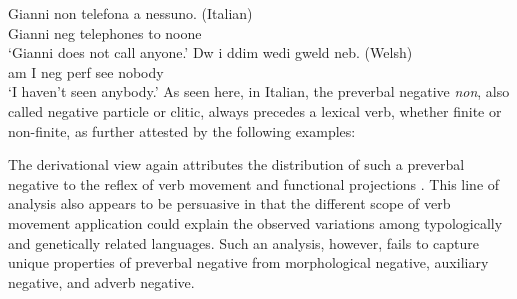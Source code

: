 \documentclass[output=paper
                ,modfonts
                		,nonflat
	        ,collection
	        ,collectionchapter
	        ,collectiontoclongg
 	        ,biblatex
                ,babelshorthands
                ,newtxmath
                ,draftmode
                ,colorlinks, citecolor=brown
]{./langsci/langscibook}
\begin{document}
{\eal
\ex \label{position-1a}
\gll Gianni non telefona a nessuno. \hfill (Italian) \\
     Gianni {\sc neg} telephones to noone\\
\glt`Gianni does not call anyone.'
\ex \label{position-1c}
\gll Dw i ddim wedi gweld neb. \hfill  (Welsh) \\
     am I {\sc neg} {\sc perf} see nobody\\
\glt `I haven't seen anybody.'
\zl
%
%
As seen here, in Italian,
the preverbal negative \textit{non}, also called negative particle or
clitic, always precedes a lexical  verb, whether finite or
non-finite, as further attested by the following
examples:

\eal
\zl

The derivational view again attributes the distribution of such
a preverbal negative to the reflex of verb movement and functional
projections \citep[see]{Belletti:90, Zanuttini:91}. This line of analysis also appears to be persuasive
in that the different scope of verb movement application could explain
the observed variations among typologically and genetically related
languages. Such an analysis, however,
  fails to capture unique properties of preverbal negative
  from morphological negative, auxiliary negative, and adverb negative.

}
\end{document}
